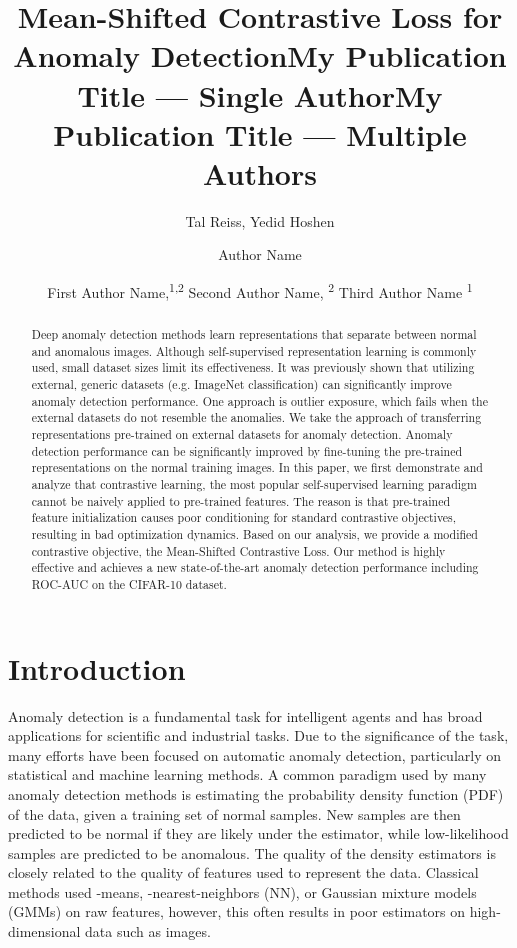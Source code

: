 \documentclass[letterpaper]{article} \usepackage{aaai23}  \usepackage{times}  \usepackage{helvet}  \usepackage{courier}  \usepackage[hyphens]{url}  \usepackage{graphicx} \usepackage{amsmath, amssymb}
\title{Mean-Shifted Contrastive Loss for Anomaly Detection}
\author{
Tal Reiss,
    Yedid Hoshen
}
\title{My Publication Title --- Single Author}
\author {
    Author Name
}
\title{My Publication Title --- Multiple Authors}
\author {
First Author Name,\textsuperscript{\rm 1,\rm 2}
    Second Author Name, \textsuperscript{\rm 2}
    Third Author Name \textsuperscript{\rm 1}
}
\begin{document}
\maketitle

\begin{abstract}
Deep anomaly detection methods learn representations that separate between normal and anomalous images. Although self-supervised representation learning is commonly used, small dataset sizes limit its effectiveness. It was previously shown that utilizing external, generic datasets (e.g. ImageNet classification) can significantly improve anomaly detection performance. One approach is outlier exposure, which fails when the external datasets do not resemble the anomalies. We take the approach of transferring representations pre-trained on external datasets for anomaly detection. Anomaly detection performance can be significantly improved by fine-tuning the pre-trained representations on the normal training images. In this paper, we first demonstrate and analyze that contrastive learning, the most popular self-supervised learning paradigm cannot be naively applied to pre-trained features.  The reason is that pre-trained feature initialization causes poor conditioning for standard contrastive objectives, resulting in bad optimization dynamics. Based on our analysis, we provide a modified contrastive objective, the Mean-Shifted Contrastive Loss. Our method is highly effective and achieves a new state-of-the-art anomaly detection performance including  ROC-AUC on the CIFAR-10 dataset.
\end{abstract}

\section{Introduction}

Anomaly detection is a fundamental task for intelligent agents and has broad applications for scientific and industrial tasks. Due to the significance of the task, many efforts have been focused on automatic anomaly detection, particularly on statistical and machine learning methods. A common paradigm used by many anomaly detection methods is estimating the probability density function (PDF) of the data, given a training set of normal samples. New samples are then predicted to be normal if they are likely under the estimator, while low-likelihood samples are predicted to be anomalous. The quality of the density estimators is closely related to the quality of features used to represent the data. Classical methods used -means, -nearest-neighbors (NN), or Gaussian mixture models (GMMs) on raw features, however, this often results in poor estimators on high-dimensional data such as images.
\end{document}
